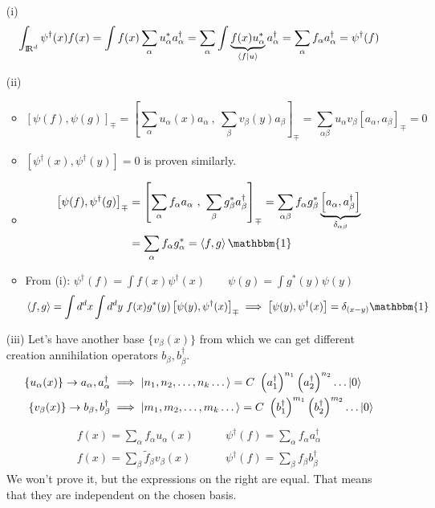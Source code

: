 \Pf \begin{enumerate}
    \item[(i)]
    \begin{align*}
        \int_{{\rm I\!R}^d} \psi^\dag(x) f(x) = \int f(x) \sum_\alpha u_\alpha^* a_\alpha^\dag = \sum_\alpha \int \underbrace{f(x)u_\alpha^*}_{\left\langle f \middle| u \right\rangle} a_\alpha^\dag = \sum_\alpha f_\alpha a_\alpha^\dag = \psi^\dag(f)
    \end{align*}
    \item[(ii)]
    \begin{itemize}
        \item $$ \left[\psi(f), \psi(g)\right]_\mp = \left[\sum_\alpha u_\alpha(x) a_\alpha \ , \ \sum_\beta v_\beta(y)a_\beta\right]_\mp = \sum_{\alpha\beta} u_\alpha v_\beta \left[a_\alpha, a_\beta\right]_\mp = 0$$
        \item $\left[\psi^\dag(x), \psi^\dag(y)\right] = 0$ is proven similarly.

        \item \begin{align*} 
            \left[\psi(f), \psi^\dag(g)\right]_\mp &= \left[\sum_\alpha f_\alpha a_\alpha \ , \ \sum_\beta g_\beta^* a_\beta^\dag\right]_\mp = \sum_{\alpha\beta} f_\alpha g_\beta^* \underbrace{\left[a_\alpha, a_\beta^\dag\right]}_{\delta_{\alpha\beta}}\\
            &= \sum_\alpha f_\alpha g_\alpha^* = \angles{f,g} \mathbbm{1}
        \end{align*}

        \item From (i): $ \psi^\dag (f) = \int f(x) \psi^\dag(x) \qquad \psi(g) = \int g^*(y) \psi(y)$
        $$ \angles {f,g} = \int d^dx\int d^dy \ f(x)g^*(y) \left[\psi(y), \psi^\dag(x)\right]_\mp \implies \left[\psi(y), \psi^\dag(x)\right] = \delta_{(x-y)} \mathbbm{1}$$
    \end{itemize}

    \item[(iii)] Let's have another base $\{v_\beta(x)\}$ from which we can get different creation annihilation operators $b_\beta, b_\beta^\dag$.
    \begin{align*}
        \{u_\alpha(x)\} \to a_\alpha,a_\alpha^\dag &\implies \ket{n_1,n_2, \dots, n_k \dots} = C\ \left(a_1^\dag\right)^{n_1}\left(a_2^\dag\right)^{n_2} \dots \ket 0\\
        \{v_\beta(x)\} \to b_\beta,b_\beta^\dag &\implies \ket{m_1,m_2, \dots, m_k \dots} = C\ \left(b_1^\dag\right)^{m_1}\left(b_2^\dag\right)^{m_2} \dots \ket 0 
    \end{align*}
    \begin{align*}
        f(x) = \sum_\alpha f_\alpha u_\alpha(x) \qquad &\psi^\dag(f) = \sum_\alpha f_\alpha a_\alpha^\dag\\
        f(x) = \sum_\beta \tilde f_\beta v_\beta(x) \qquad &\psi^\dag(f) = \sum_\beta f_\beta b_\beta^\dag
    \end{align*}
    We won't prove it, but the expressions on the right are equal. That means that they are independent on the chosen basis.
    

\end{enumerate}
